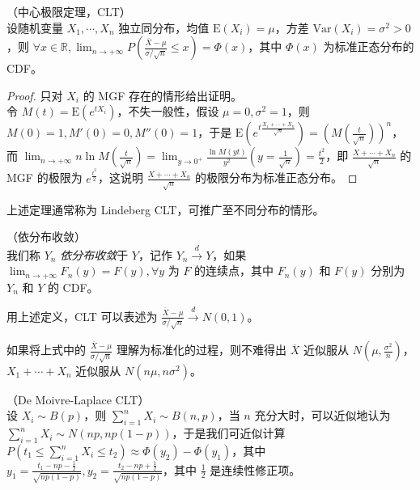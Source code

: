 \documentclass[../main.tex]{subfiles}
\begin{document}
\begin{theorem}\label{thm:5.3.1}
    （中心极限定理，CLT）\\
    设随机变量 $X_1,\cdots,X_n$ 独立同分布，均值 $\mathrm E(X_i)=\mu$，方差 $\mathrm{Var}(X_i)=\sigma^2>0$，则 $\forall x\in\mathbb R,\lim_{n\rightarrow+\infty}P\left(\frac{\overline X-\mu}{\sigma/\sqrt n}\leq x\right)=\Phi(x)$，其中 $\Phi(x)$ 为标准正态分布的 CDF。
\end{theorem}

\begin{proof}
    只对 $X_i$ 的 MGF 存在的情形给出证明。\\
    令 $M(t)=\mathrm E(e^{tX_i})$，不失一般性，假设 $\mu=0,\sigma^2=1$，则 $M(0)=1,M'(0)=0,M''(0)=1$，于是 $\mathrm E(e^{t\frac{X_1+\cdots+X_n}{\sqrt n}})=\left(M\left(\frac t{\sqrt n}\right)\right)^n$，而 $\lim_{n\rightarrow +\infty}n\ln M(\frac t{\sqrt n})=\lim_{y\rightarrow 0^+}\frac{\ln M(yt)}{y^2}(y=\frac1{\sqrt{n}})=\frac{t^2}2$，即 $\frac{X+\cdots+X_n}{\sqrt n}$ 的 MGF 的极限为 $e^{\frac{t^2}2}$，这说明 $\frac{X+\cdots+X_n}{\sqrt n}$ 的极限分布为标准正态分布。
\end{proof}

上述定理通常称为 Lindeberg CLT，可推广至不同分布的情形。

\begin{definition}\label{def:5.3.1}
    （依分布收敛）\\
    我们称 $Y_n$ \emph{依分布收敛}于 $Y$，记作 $Y_n\overset{d}{\rightarrow}Y$，如果 $\lim_{n\rightarrow+\infty}F_n(y)=F(y),\forall y\text{ 为 $F$ 的连续点}$，其中 $F_n(y)$ 和 $F(y)$ 分别为 $Y_n$ 和 $Y$ 的 CDF。
\end{definition}

用上述定义，CLT 可以表述为 $\frac{\overline X-\mu}{\sigma/\sqrt n}\overset{d}{\rightarrow}N(0,1)$。

如果将上式中的 $\frac{\overline X-\mu}{\sigma/\sqrt n}$ 理解为标准化的过程，则不难得出 $\overline X$ 近似服从 $N(\mu,\frac{\sigma^2}n)$，$X_1+\cdots+X_n$ 近似服从 $N(n\mu,n\sigma^2)$。

\begin{example}
    （De Moivre-Laplace CLT）\\
    设 $X_i\sim B(p)$，则 $\sum_{i=1}^nX_i\sim B(n,p)$，当 $n$ 充分大时，可以近似地认为 $\sum_{i=1}^nX_i\sim N(np,np(1-p))$，于是我们可近似计算 $P(t_1\leq \sum_{i=1}^nX_i\leq t_2)\approx \Phi(y_2)-\Phi(y_1)$，其中 $y_1=\frac{t_1-np-\frac12}{\sqrt{np(1-p)}},y_2=\frac{t_2-np+\frac12}{\sqrt{np(1-p)}}$，其中 $\frac12$ 是连续性修正项。
\end{example}
\end{document}
